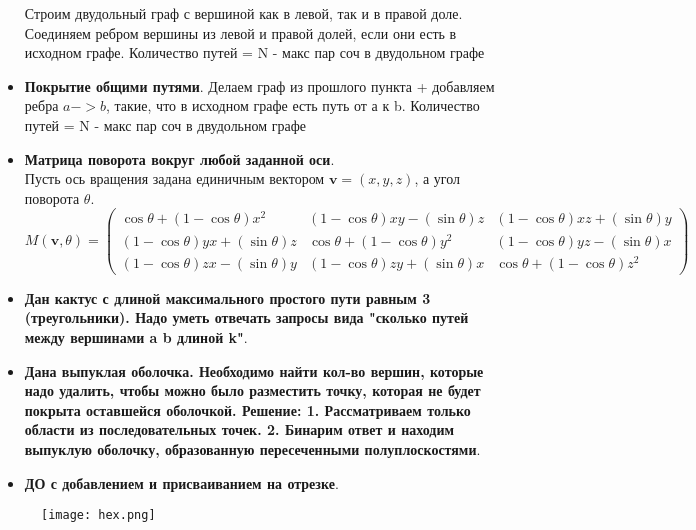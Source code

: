 \documentclass[10pt]{article}
\begin{document}
\begin{itemize}
Строим двудольный граф с вершиной как в левой, так и в правой доле.
Соединяем ребром вершины из левой и правой долей, если они есть в исходном графе.
Количество путей = N - макс пар соч в двудольном графе
\item \textbf{Покрытие общими путями}.
Делаем граф из прошлого пункта + добавляем ребра $a->b$, такие, что
в исходном графе есть путь от а к b. Количество путей = N - макс пар соч в двудольном графе
\item \textbf{Матрица поворота вокруг любой заданной оси}.\\
Пусть ось вращения задана единичным вектором $\mathbf{v} = (x,y,z)$, а угол поворота $\theta$.
\begin{equation*}
  M(\mathbf{v}, \theta) = \left(
  \begin{array}{cccc}
  \cos{\theta} + (1 - \cos{\theta})x^2 & (1 - \cos{\theta})xy - (\sin{\theta})z & (1 - \cos{\theta})xz + (\sin{\theta})y\\
  (1 - \cos{\theta})yx + (\sin{\theta})z & \cos{\theta} + (1 - \cos{\theta})y^2 & (1 - \cos{\theta})yz - (\sin{\theta})x\\
  (1 - \cos{\theta})zx - (\sin{\theta})y & (1 - \cos{\theta})zy + (\sin{\theta})x & \cos{\theta} + (1 - \cos{\theta})z^2
  \end{array}
  \right)
\end{equation*}
\newpage
\item \textbf{Дан кактус с длиной максимального простого пути равным 3 (треугольники). 
Надо уметь отвечать запросы вида "сколько путей между вершинами a b длиной k"}.
\begin{multicols}{2}

\end{multicols}
\item \textbf{Дана выпуклая оболочка. Необходимо найти кол-во вершин, которые надо удалить,
чтобы можно было разместить точку, которая не будет покрыта оставшейся оболочкой.\newline
Решение: 
1. Рассматриваем только области из последовательных точек.
2. Бинарим ответ и находим выпуклую оболочку, образованную пересеченными полуплоскостями}.
\begin{multicols}{2}

\end{multicols}
\item \textbf{ДО с добавлением и присваиванием на отрезке}.
\begin{multicols}{2}

\end{multicols}
\end{itemize}
\newpage
\begin{figure}[h]

  \centering
  
  \texttt{[image: hex.png]}
  
  \label{fig:mpr}
  
  \end{figure}
\end{document}
